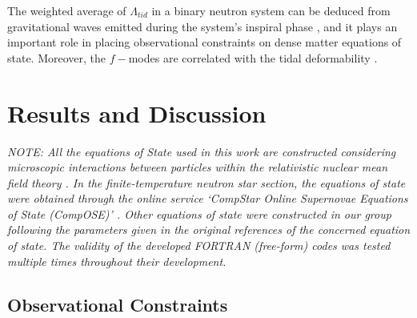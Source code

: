 \documentclass[a4paper,12pt,onehalfspacing]{report}
\begin{document}
The weighted average of $\Lambda_{tid}$ in a binary neutron system can be deduced from gravitational waves emitted during the system's inspiral phase \cite{Hinderer_tidal_uses}, and it plays an important role in placing observational constraints on dense matter equations of state. Moreover, the $f-$modes are correlated with the tidal deformability \cite{Chan_f_tide_relation}.

\newpage
\chapter{Results and Discussion}

\emph{\emph{NOTE:} All the equations of State used in this work are constructed considering microscopic interactions between particles within the relativistic nuclear mean field theory \cite{Glendenning}. In the finite-temperature neutron star section, the equations of state were obtained through the online service `CompStar Online Supernovae Equations of State (CompOSE)' \cite{CompOSE}. Other equations of state were constructed in our group following the parameters given in the original references of the concerned equation of state. The validity of the developed FORTRAN (free-form) codes was tested multiple times throughout their development.}

\section{Observational Constraints}
\end{document}
